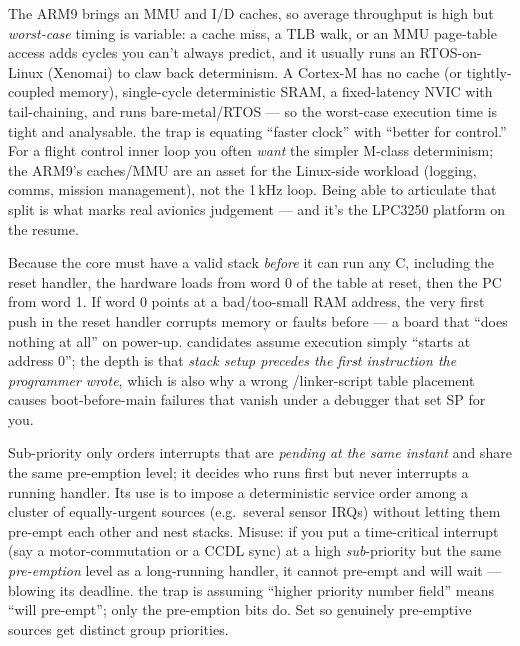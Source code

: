 The ARM9 brings an MMU and I/D caches, so average throughput is high but
\emph{worst-case} timing is variable: a cache miss, a TLB walk, or an MMU
page-table access adds cycles you can't always predict, and it usually runs an
RTOS-on-Linux (Xenomai) to claw back determinism. A Cortex-M has no cache
(or tightly-coupled memory), single-cycle deterministic SRAM, a fixed-latency
NVIC with tail-chaining, and runs bare-metal/RTOS --- so the worst-case
execution time is tight and analysable. \trap the trap is equating ``faster
clock'' with ``better for control.'' For a flight control inner loop you often
\emph{want} the simpler M-class determinism; the ARM9's caches/MMU are an
asset for the Linux-side workload (logging, comms, mission management), not the
1\,kHz loop. Being able to articulate that split is what marks real avionics
judgement --- and it's the LPC3250 platform on the resume.

Because the core must have a valid stack \emph{before} it can run any C,
including the reset handler, the hardware loads  from word 0 of the
table at reset, then the PC from word 1. If word 0 points at a bad/too-small
RAM address, the very first push in the reset handler corrupts memory or faults
before  --- a board that ``does nothing at all'' on power-up. \trap
candidates assume execution simply ``starts at address 0''; the depth is that
\emph{stack setup precedes the first instruction the programmer wrote}, which
is also why a wrong /linker-script table placement causes
boot-before-main failures that vanish under a debugger that set SP for you.

Sub-priority only orders interrupts that are \emph{pending at the same instant}
and share the same pre-emption level; it decides who runs first but never
interrupts a running handler. Its use is to impose a deterministic service
order among a cluster of equally-urgent sources (e.g.\ several sensor IRQs)
without letting them pre-empt each other and nest stacks. Misuse: if you put a
time-critical interrupt (say a motor-commutation or a CCDL sync) at a high
\emph{sub}-priority but the same \emph{pre-emption} level as a long-running
handler, it cannot pre-empt and will wait --- blowing its deadline. \trap the
trap is assuming ``higher priority number field'' means ``will pre-empt''; only
the pre-emption bits do. Set  so genuinely pre-emptive sources
get distinct group priorities.


